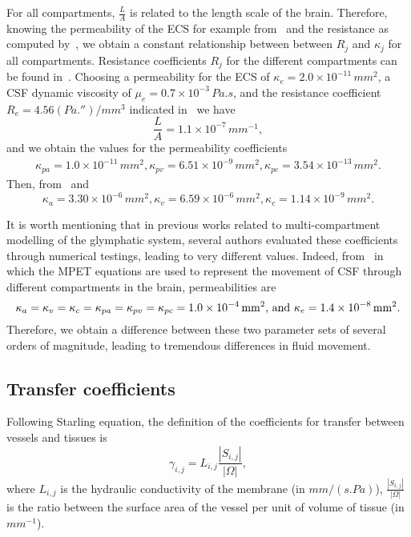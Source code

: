 \documentclass[10pt]{article}
\newcommand{\1}{^{(1)}}
\newcommand{\2}{^{(2)}}
\newcommand{\abs}[1]{\left\lvert#1\right\rvert}
\begin{document}
For all compartments,  $\frac{L}{A}$ is related to the length scale of the brain. 
Therefore, knowing the permeability of the ECS for example from~\cite{Holter9894} and the resistance as computed by~\cite{Vinje-2020-ICP}, we obtain a constant relationship between between $R_j$ and $\kappa_j$ for all compartments. 
Resistance coefficients $R_j$ for the different compartments can be found in~\cite{Vinje-2020-ICP}.
Choosing a permeability for the ECS of $\kappa_e = 2.0\times 10^{-11}\,\si{mm^2}$, a CSF dynamic viscosity of $\mu_e = 0.7\times 10^{-3}\, \si{Pa.s}$, and the resistance coefficient $R_e = 4.56 \si{(Pa . \second)\per mm^3} $ indicated in~\cite{Vinje-2020-ICP} we have 
\[
    \frac{L}{A} = 1.1 \times 10^{-7}\, \si{mm^{-1}},
\]
and we obtain the values for the permeability coefficients
\[
\begin{aligned}
\kappa_{pa} = 1.0 \times 10^{-11}\,\si{mm^2}, \kappa_{pv} = 6.51\times 10^{-9}\,\si{mm^2}, \kappa_{pc} = 3.54\times 10^{-13}\,\si{mm^2}. 
\end{aligned}
\]
Then, from~\cite{el2015multi} and~\cite{jozsa2021porous}
\[
\kappa_a =  3.30 \times 10^{-6}\,\si{mm^2}, \kappa_v =6.59 \times 10^{-6}\,\si{mm^2}, \kappa_c = 1.14 \times 10^{-9}\,\si{mm^2}.
\]


It is worth mentioning that in previous works related to multi-compartment modelling of the glymphatic system, several authors evaluated these coefficients through numerical testings, leading to very different values. Indeed, from~\cite{tully_ventikos_2011,Guo-2019-MPET,eliseussen2021posteriori} in which the MPET equations are used to represent the movement of CSF through different compartments in the brain, permeabilities are 
\[
    \kappa_{a} = \kappa_v = \kappa_{c}  = \kappa_{pa} = \kappa_{pv} = \kappa_{pc}  = 1.0 \times 10^{-4}\,\text{\si{mm^2}, and } \kappa_e = 1.4\times 10^{-8} \, \text{\si{mm^2}}.
\]
Therefore, we obtain a difference between these two parameter sets of several orders of magnitude, leading to tremendous differences in fluid movement. 



\subsection{Transfer coefficients}




Following Starling equation, the definition of the coefficients for transfer between vessels and tissues is
\begin{equation}
    \gamma_{i, j} = L_{i,j} \frac{\abs{S_{i,j}}}{\abs{\Omega}}, 
    \label{eq:mass-transfer-convect}
\end{equation}
where $L_{i,j}$ is the hydraulic conductivity of the membrane (in $\si{mm /(s. Pa)}$), $\frac{\abs{S_{i,j}}}{\abs{\Omega}}$ is the ratio between the surface area of the vessel per unit of volume of tissue (in $\si{mm^{-1}}$). 
\end{document}
